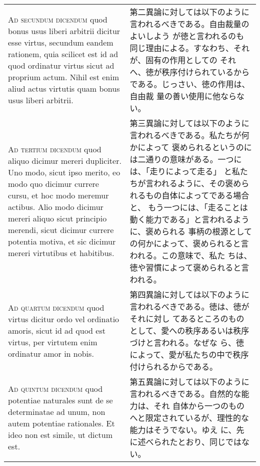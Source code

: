 \documentclass[10pt]{jsarticle}
\begin{document}
\begin{longtable}{p{21em}p{21em}}
\\

{\scshape Ad secundum dicendum} quod bonus usus liberi arbitrii
dicitur esse virtus, secundum eandem rationem, quia scilicet est id ad
quod ordinatur virtus sicut ad proprium actum. Nihil est enim aliud
actus virtutis quam bonus usus liberi arbitrii.

&

第二異論に対しては以下のように言われるべきである。自由裁量のよいしよう
が徳と言われるのも同じ理由による。すなわち、それが、固有の作用としての
それへ、徳が秩序付けられているからである。じっさい、徳の作用は、自由裁
量の善い使用に他ならない。

\\

{\scshape Ad tertium dicendum} quod aliquo dicimur mereri
dupliciter. Uno modo, sicut ipso merito, eo modo quo dicimur currere
cursu, et hoc modo meremur actibus. Alio modo dicimur mereri aliquo
sicut principio merendi, sicut dicimur currere potentia motiva, et sic
dicimur mereri virtutibus et habitibus.

&

第三異論に対しては以下のように言われるべきである。私たちが何かによって
褒められるというのには二通りの意味がある。一つには、「走りによって走る」
と私たちが言われるように、その褒められるもの自体によってである場合と、
もう一つには、「走ることは動く能力である」と言われるように、褒められる
事柄の根源としての何かによって、褒められると言われる。この意味で、私た
ちは、徳や習慣によって褒められると言われる。

\\

{\scshape Ad quartum dicendum} quod virtus dicitur ordo vel ordinatio
amoris, sicut id ad quod est virtus, per virtutem enim ordinatur amor
in nobis.

&

第四異論に対しては以下のように言われるべきである。徳は、徳がそれに対し
てあるところのものとして、愛への秩序あるいは秩序づけと言われる。なぜな
ら、徳によって、愛が私たちの中で秩序付けられるからである。

\\

{\scshape Ad quintum dicendum} quod potentiae naturales sunt de se
determinatae ad unum, non autem potentiae rationales. Et ideo non est
simile, ut dictum est.

&

第五異論に対しては以下のように言われるべきである。自然的な能力は、それ
自体から一つのものへと限定されているが、理性的な能力はそうでない。ゆえ
に、先に述べられたとおり、同じではない。

\end{longtable}
\newpage
\end{document}
